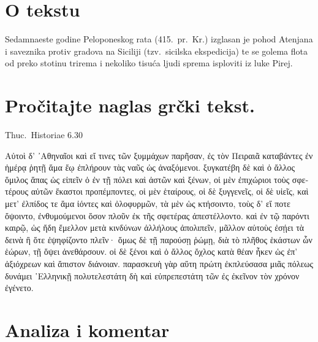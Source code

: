 


\section*{O tekstu}

Sedamnaeste godine Peloponeskog rata (415.\ pr.\ Kr.) izglasan je pohod Atenjana i saveznika protiv gradova na Siciliji (tzv.\ sicilska ekspedicija) te se golema flota od preko stotinu trirema i nekoliko tisuća ljudi sprema isploviti iz luke Pirej.


\section*{Pročitajte naglas grčki tekst.}


Thuc.\ Historiae 6.30

\medskip

{\large
\begin{greek}
\noindent Αὐτοὶ δ' ᾿Αθηναῖοι καὶ εἴ τινες τῶν ξυμμάχων παρῆσαν, ἐς τὸν Πειραιᾶ καταβάντες ἐν ἡμέρᾳ ῥητῇ ἅμα ἕῳ ἐπλήρουν τὰς ναῦς ὡς ἀναξόμενοι. ξυγκατέβη δὲ καὶ ὁ ἄλλος ὅμιλος ἅπας ὡς εἰπεῖν ὁ ἐν τῇ πόλει καὶ ἀστῶν καὶ ξένων, οἱ μὲν ἐπιχώριοι τοὺς σφετέρους αὐτῶν ἕκαστοι προπέμποντες, οἱ μὲν ἑταίρους, οἱ δὲ ξυγγενεῖς, οἱ δὲ υἱεῖς, καὶ μετ' ἐλπίδος τε ἅμα ἰόντες καὶ ὀλοφυρμῶν, τὰ μὲν ὡς κτήσοιντο, τοὺς δ' εἴ ποτε ὄψοιντο, ἐνθυμούμενοι ὅσον πλοῦν ἐκ τῆς σφετέρας ἀπεστέλλοντο. καὶ ἐν τῷ παρόντι καιρῷ, ὡς ἤδη ἔμελλον μετὰ κινδύνων ἀλλήλους ἀπολιπεῖν, μᾶλλον αὐτοὺς ἐσῄει τὰ δεινὰ ἢ ὅτε ἐψηφίζοντο πλεῖν· ὅμως δὲ τῇ παρούσῃ ῥώμῃ, διὰ τὸ πλῆθος ἑκάστων ὧν ἑώρων, τῇ ὄψει ἀνεθάρσουν. οἱ δὲ ξένοι καὶ ὁ ἄλλος ὄχλος κατὰ θέαν ἧκεν ὡς ἐπ' ἀξιόχρεων καὶ ἄπιστον διάνοιαν. παρασκευὴ γὰρ αὕτη πρώτη ἐκπλεύσασα μιᾶς πόλεως δυνάμει ῾Ελληνικῇ πολυτελεστάτη δὴ καὶ εὐπρεπεστάτη τῶν ἐς ἐκεῖνον τὸν χρόνον ἐγένετο.

\end{greek}

}

\section*{Analiza i komentar}


